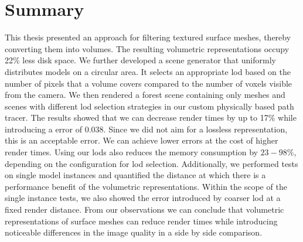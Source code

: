 \chapter{Summary}
\label{chap:summary}
This thesis presented an approach for filtering textured surface meshes, thereby converting them into volumes.
The resulting volumetric representations occupy 22\% less disk space.
We further developed a scene generator that uniformly distributes models on a circular area.
It selects an appropriate \ac{lod} based on the number of pixels that a volume covers compared to the number of voxels visible from the camera.
We then rendered a forest scene containing only meshes and scenes with different \ac{lod} selection strategies in our custom physically based path tracer.
The results showed that we can decrease render times by up to 17\% while introducing a \FLIP error of 0.038.
Since we did not aim for a lossless representation, this is an acceptable error.
We can achieve lower \FLIP errors at the cost of higher render times.
Using our \acsp{lod} also reduces the memory consumption by $23-98\%$, depending on the configuration for \ac{lod} selection.
Additionally, we performed tests on single model instances and quantified the distance at which there is a performance benefit of the volumetric representations.
Within the scope of the single instance tests, we also showed the error introduced by coarser \ac{lod} at a fixed render distance.
From our observations we can conclude that volumetric representations of surface meshes can reduce render times while introducing noticeable differences in the image quality in a side by side comparison.